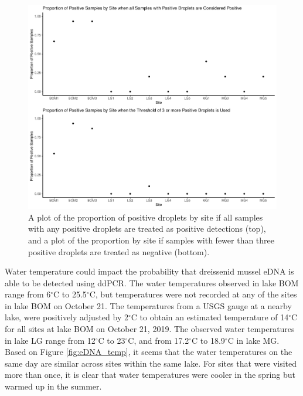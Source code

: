 \documentclass[12pt]{article}\usepackage[]{graphicx}\usepackage[]{color}
\makeatletter
\def\maxwidth{ %
  \ifdim\Gin@nat@width>\linewidth
    \linewidth
  \else
    \Gin@nat@width
  \fi
}
\newenvironment{knitrout}{}{} %
\def\maxwidth{ %
  \ifdim\Gin@nat@width>\linewidth
    \linewidth
  \else
    \Gin@nat@width
  \fi
}
\newenvironment{knitrout}{}{} %
\makeatother
\begin{document}
\begin{figure}[]
\begin{knitrout}
\color{fgcolor}

{\centering \includegraphics[width=\maxwidth]{figure/eDNA_visualization_sample-1} 

}



\end{knitrout}
\caption{A plot of the proportion of positive droplets by site if all samples with any positive droplets are treated as positive detections (top), and a plot of the proportion by site if samples with fewer than three positive droplets are treated as negative (bottom).}
\label{fig:eDNA_sample}
\end{figure}

Water temperature could impact the probability that dreissenid mussel eDNA is able to be detected using ddPCR. The water temperatures observed in lake BOM range from 6$^\circ$C to 25.5$^\circ$C, but temperatures were not recorded at any of the sites in lake BOM on October 21. The temperatures from a USGS gauge at a nearby lake, were positively adjusted by 2$^\circ$C to obtain an estimated temperature of 14$^\circ$C for all sites at lake BOM on October 21, 2019. The observed water temperatures in lake LG range from 12$^\circ$C to 23$^\circ$C, and from 17.2$^\circ$C to 18.9$^\circ$C in lake MG. Based on Figure \ref{fig:eDNA_temp}, it seems that the water temperatures on the same day are similar across sites within the same lake. For sites that were visited more than once, it is clear that water temperatures were cooler in the spring but warmed up in the summer. 
\end{document}
